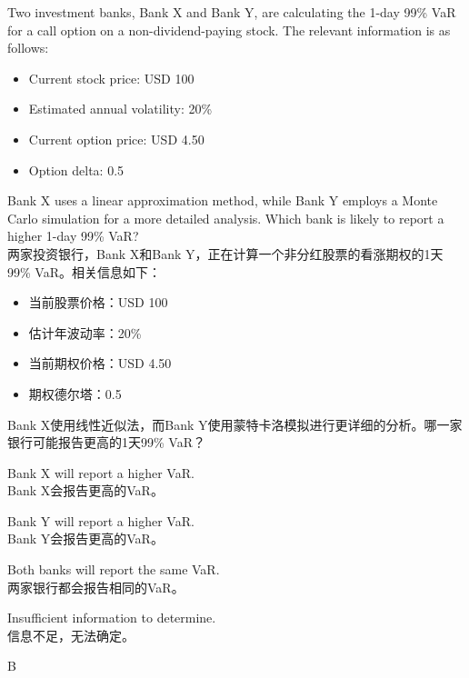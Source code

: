 \documentclass{article}
\newcounter{question} %
\begin{document}
    \begin{question}
        Two investment banks, Bank X and Bank Y, are calculating the 1-day 99\% VaR for a call option on a non-dividend-paying stock. The relevant information is as follows:
        
        \begin{itemize}
            \item Current stock price: USD 100
            \item Estimated annual volatility: 20\%
            \item Current option price: USD 4.50
            \item Option delta: 0.5
        \end{itemize}
        
        Bank X uses a linear approximation method, while Bank Y employs a Monte Carlo simulation for a more detailed analysis. Which bank is likely to report a higher 1-day 99\% VaR?
        \\两家投资银行，Bank X和Bank Y，正在计算一个非分红股票的看涨期权的1天99\% VaR。相关信息如下：
        \begin{itemize}
            \item 当前股票价格：USD 100
            \item 估计年波动率：20\%
            \item 当前期权价格：USD 4.50
            \item 期权德尔塔：0.5
        \end{itemize}
        Bank X使用线性近似法，而Bank Y使用蒙特卡洛模拟进行更详细的分析。哪一家银行可能报告更高的1天99\% VaR？
    \end{question}
    
    \begin{choices}
        \item Bank X will report a higher VaR.\\ Bank X会报告更高的VaR。  
        \item Bank Y will report a higher VaR.\\ Bank Y会报告更高的VaR。  
        \item Both banks will report the same VaR.\\ 两家银行都会报告相同的VaR。  
        \item Insufficient information to determine.\\ 信息不足，无法确定。  
    \end{choices}
    
    \begin{correctanswer}
        B
    \end{correctanswer}
    
\end{document}
